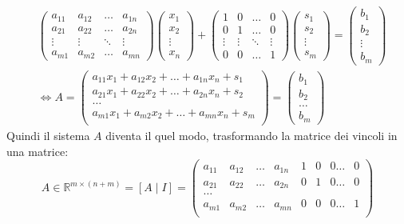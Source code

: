 \[
\begin{aligned}
&\begin{pmatrix}
a_{11} & a_{12} & \dots & a_{1n} \\
a_{21} & a_{22} & \dots & a_{2n} \\
\vdots & \vdots & \ddots & \vdots \\
a_{m1} & a_{m2} & \dots & a_{mn}
\end{pmatrix}
\begin{pmatrix}
x_1 \\ x_2 \\ \vdots \\ x_n
\end{pmatrix}
+
\begin{pmatrix}
1 & 0 & \dots & 0 \\
0 & 1 & \dots & 0 \\
\vdots & \vdots & \ddots & \vdots \\
0 & 0 & \dots & 1
\end{pmatrix}
\begin{pmatrix}
s_1 \\ s_2 \\ \vdots \\ s_m
\end{pmatrix}
=
\begin{pmatrix}
b_1 \\ b_2 \\ \vdots \\ b_m
\end{pmatrix}
\\[10pt]
&\Longleftrightarrow
A =
\begin{pmatrix}
    a_{11} x_1 + a_{12} x_2 + \dots + a_{1n} x_n + s_1\\
    a_{21} x_1 + a_{22} x_2 + \dots + a_{2n} x_n + s_2 \\
    \dots \\
    a_{m1} x_1 + a_{m2} x_2 + \dots + a_{mn} x_n + s_m\\
\end{pmatrix} = 
\begin{pmatrix}
    b_1 \\ b_2 \\ \dots \\ b_m
\end{pmatrix}
\end{aligned}
\]
Quindi il sistema $A$ diventa il quel modo, trasformando la matrice dei vincoli in una matrice:
\[
A \in \mathbb{R} ^ {m \times (n + m)} =
[A\mid I]=
\begin{pmatrix}
a_{11}&a_{12}&\dots&a_{1n}&1&0&0\dots&0\\
a_{21}&a_{22}&\dots&a_{2n}&0&1&0\dots&0\\
\dots \\
a_{m1}&a_{m2}&\dots&a_{mn}&0&0&0\dots&1\\
\end{pmatrix}
\]
